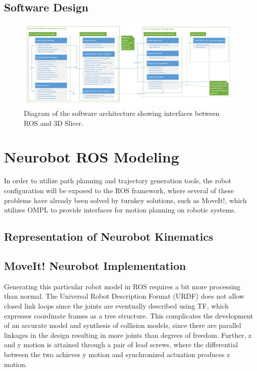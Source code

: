 \documentclass[12pt]{report}
\begin{document}
\section{Software Design}
\begin{figure}[thpb]
	\centering
	\includegraphics[width=\textwidth]{diagrams/Software_Diagrams.pdf}
    \caption{Diagram of the software architecture showing interfaces between ROS and 3D Slicer. }
    \label{fig:softwareDiagram}
\end{figure}


\chapter{Neurobot ROS Modeling}
In order to utilize path planning and trajectory generation tools, the robot configuration will be exposed to the ROS framework, where several of these problems have already been solved by turnkey solutions, such as MoveIt!, which utilizes OMPL to provide interfaces for motion planning on robotic systems. \cite{moveIt} 
\section{Representation of Neurobot Kinematics}

\section{MoveIt! Neurobot Implementation}
Generating this particular robot model in ROS requires a bit more processing than normal. The Universal Robot Description Format (URDF) does not allow closed link loops since the joints are eventually described using TF, which expresses coordinate frames as a tree structure. This complicates the development of an accurate model and synthesis of collision models, since there are parallel linkages in the design resulting in more joints than degrees of freedom. Further, z and y motion is attained through a pair of lead screws, where the differential between the two achieves y motion and synchronized actuation produces z motion. 
\end{document}
